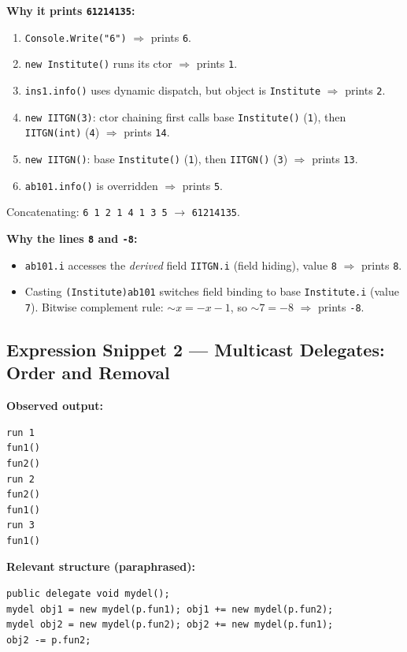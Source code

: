 \textbf{Why it prints \texttt{61214135}:}
\begin{enumerate}
  \item \verb|Console.Write("6")| $\Rightarrow$ prints \verb|6|.
  \item \verb|new Institute()| runs its ctor \(\Rightarrow\) prints \verb|1|.
  \item \verb|ins1.info()| uses dynamic dispatch, but object is \verb|Institute| \(\Rightarrow\) prints \verb|2|.
  \item \verb|new IITGN(3)|: ctor chaining first calls base \verb|Institute()| (\verb|1|), then \verb|IITGN(int)| (\verb|4|) \(\Rightarrow\) prints \verb|14|.
  \item \verb|new IITGN()|: base \verb|Institute()| (\verb|1|), then \verb|IITGN()| (\verb|3|) \(\Rightarrow\) prints \verb|13|.
  \item \verb|ab101.info()| is overridden \(\Rightarrow\) prints \verb|5|.
\end{enumerate}
Concatenating: \verb|6 1 2 1 4 1 3 5| \(\to\) \verb|61214135|.

\textbf{Why the lines \texttt{8} and \texttt{-8}:}
\begin{itemize}
  \item \verb|ab101.i| accesses the \emph{derived} field \verb|IITGN.i| (field hiding), value \verb|8| \(\Rightarrow\) prints \verb|8|.
  \item Casting \verb|(Institute)ab101| switches field binding to base \verb|Institute.i| (value \verb|7|). Bitwise complement rule: \(\sim x = -x - 1\), so \(\sim 7 = -8\) \(\Rightarrow\) prints \verb|-8|.
\end{itemize}

\subsection*{Expression Snippet 2 — Multicast Delegates: Order and Removal}
\textbf{Observed output:}
\begin{verbatim}
run 1
fun1()
fun2()
run 2
fun2()
fun1()
run 3
fun1()
\end{verbatim}

\textbf{Relevant structure (paraphrased):}
\begin{verbatim}
public delegate void mydel();
mydel obj1 = new mydel(p.fun1); obj1 += new mydel(p.fun2);
mydel obj2 = new mydel(p.fun2); obj2 += new mydel(p.fun1);
obj2 -= p.fun2;
\end{verbatim}

